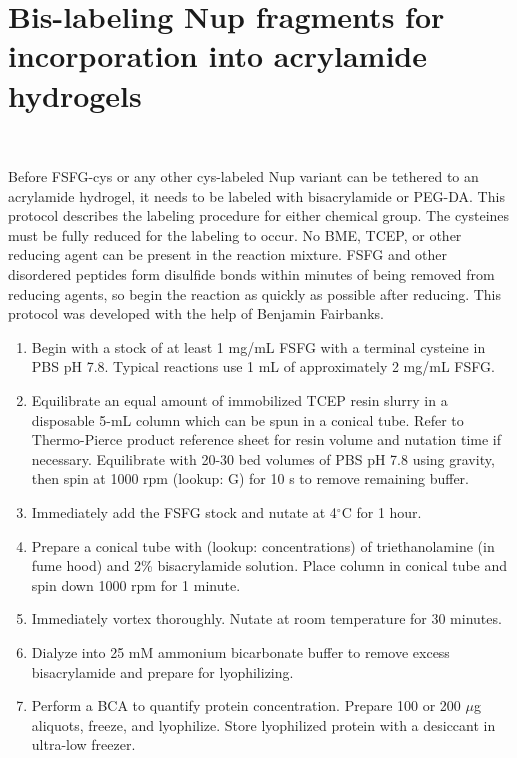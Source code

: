 \chapter{Bis-labeling Nup fragments for incorporation into acrylamide hydrogels}~\label{appx:bis-labeling}

Before FSFG-cys or any other cys-labeled Nup variant can be tethered to an acrylamide hydrogel, it needs to be labeled with bisacrylamide or PEG-DA.  This protocol describes the labeling procedure for either chemical group.  The cysteines must be fully reduced for the labeling to occur.  No BME, TCEP, or other reducing agent can be present in the reaction mixture.  FSFG and other disordered peptides form disulfide bonds within minutes of being removed from reducing agents, so begin the reaction as quickly as possible after reducing.  This protocol was developed with the help of Benjamin Fairbanks.

\begin{enumerate}
\item Begin with a stock of at least 1 mg/mL FSFG with a terminal cysteine in PBS pH 7.8.  Typical reactions use 1 mL of approximately 2 mg/mL FSFG.
\item Equilibrate an equal amount of immobilized TCEP resin slurry in a disposable 5-mL column which can be spun in a conical tube.  Refer to Thermo-Pierce product reference sheet for resin volume and nutation time if necessary.  Equilibrate with 20-30 bed volumes of PBS pH 7.8 using gravity, then spin at 1000 rpm (lookup: G) for 10 s to remove remaining buffer.
\item Immediately add the FSFG stock and nutate at 4$^\circ$C for 1 hour.
\item Prepare a conical tube with (lookup: concentrations) of triethanolamine (in fume hood) and 2\% bisacrylamide solution.  Place column in conical tube and spin down 1000 rpm for 1 minute.
\item Immediately vortex thoroughly.  Nutate at room temperature for 30 minutes.
\item Dialyze into 25 mM ammonium bicarbonate buffer to remove excess bisacrylamide and prepare for lyophilizing.
\item Perform a BCA to quantify protein concentration. Prepare 100 or 200 $\mu$g aliquots, freeze, and lyophilize.  Store lyophilized protein with a desiccant in ultra-low freezer.
\end{enumerate}
